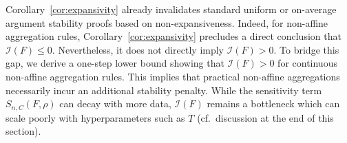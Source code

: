 \documentclass[twoside,11pt]{article}
\newcommand\mc{\mathcal}
\begin{document}
Corollary~\ref{cor:expansivity} already invalidates standard uniform or on-average argument stability proofs based on non-expansiveness. 
Indeed, for non-affine aggregation rules, Corollary~\ref{cor:expansivity} precludes a direct conclusion that $\mathcal{I}(F) \leq 0$. 
Nevertheless, it does not directly imply $\mathcal{I}(F) > 0$. 
To bridge this gap, we derive a one-step lower bound 
showing that $\mathcal{I}(F) > 0$ for continuous non-affine aggregation rules. 
This implies that practical non-affine aggregations necessarily incur an additional stability penalty.
While the sensitivity term $S_{n, C}(F, \rho)$ can decay with more data, $\mathcal{I}(F)$ remains a bottleneck which can 
scale poorly with hyperparameters such as $T$ (cf.\ discussion at the end of this section).


\end{document}
